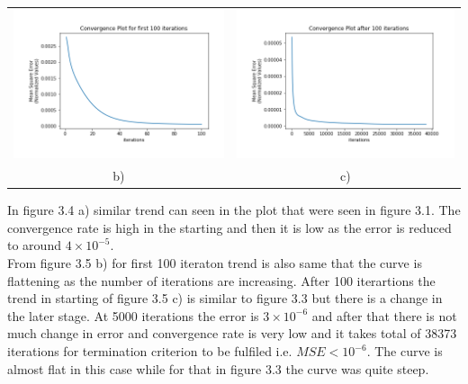 \begin{center}
\begin{tabular}{cc}
		\includegraphics[scale=0.5]{images/comparison/Convergence_Plot1_a.png} & \includegraphics[scale=0.5]{images/comparison/Convergence_Plot2_a.png}\\
		b) & c)\\
	\end{tabular}
\end{center}
In figure 3.4 a) similar trend can seen in the plot that were seen in figure 3.1. The convergence rate is high in the starting and then it is low as the error is reduced to around $4\times10^{-5}$.\\
From figure 3.5 b) for first 100 iteraton trend is also same that the curve is flattening as the number of iterations are increasing. After 100 iterartions the trend in starting of figure 3.5 c) is similar to figure 3.3 but there is a change in the later stage. At 5000 iterations the error is $3\times10^{-6}$ and after that there is not much change in error and convergence rate is very low and it takes total of 38373 iterations for termination criterion to be fulfiled i.e. $MSE<10^{-6}$. The curve is almost flat in this case while for that in figure 3.3 the curve was quite steep.

